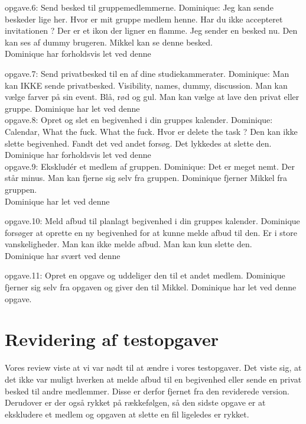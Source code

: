 \documentclass[12pt]{article}
\begin{document}
\begin{enumerate}
opgave.6: Send besked til gruppemedlemmerne.
Dominique: Jeg kan sende beskeder lige her. Hvor er mit gruppe medlem henne. Har du ikke accepteret invitationen ? Der er et ikon der ligner en flamme. Jeg sender en besked nu. Den kan ses af dummy brugeren. Mikkel kan se denne besked.\\
Dominique har forholdsvis let ved denne 

opgave.7: Send privatbesked til en af dine studiekammerater.
Dominique: Man kan IKKE sende privatbesked.
Visibility, names, dummy, discussion. Man kan vælge farver på sin event. Blå, rød og gul. Man kan vælge at lave den privat eller gruppe.
Dominique har let ved denne \\

opgave.8: Opret og slet en begivenhed i din gruppes kalender.
Dominique: Calendar, What the fuck. What the fuck. Hvor er delete the task ? Den kan ikke slette begivenhed. Fandt det ved andet forsøg. Det lykkedes at slette den.
Dominique har forholdsvis let ved denne \\

opgave.9: Ekskludér et medlem af gruppen.
Dominique: Det er meget nemt. Der står minus. Man kan fjerne sig selv fra gruppen. Dominique fjerner Mikkel fra gruppen.\\
Dominique har let ved denne 

opgave.10: Meld afbud til planlagt begivenhed i din gruppes kalender.
Dominique forsøger at oprette en ny begivenhed for at kunne melde afbud til den. Er i store vanskeligheder. Man kan ikke melde afbud. Man kan kun slette den.\\
Dominique har svært ved denne 

opgave.11: Opret en opgave og uddeliger den til et andet medlem.
Dominique fjerner sig selv fra opgaven og giver den til Mikkel.
Dominique har let ved denne opgave.\\

\end{enumerate}


\section{Revidering af testopgaver}

Vores review viste at vi var nødt til at ændre i vores testopgaver. Det viste sig, at  det ikke var muligt hverken at melde afbud til en begivenhed eller sende en privat besked til andre medlemmer. Disse er derfor fjernet fra den reviderede version. Derudover er der også rykket på rækkefølgen, så den sidste opgave er at ekskludere et medlem og opgaven at slette en fil ligeledes er rykket.
\end{document}
